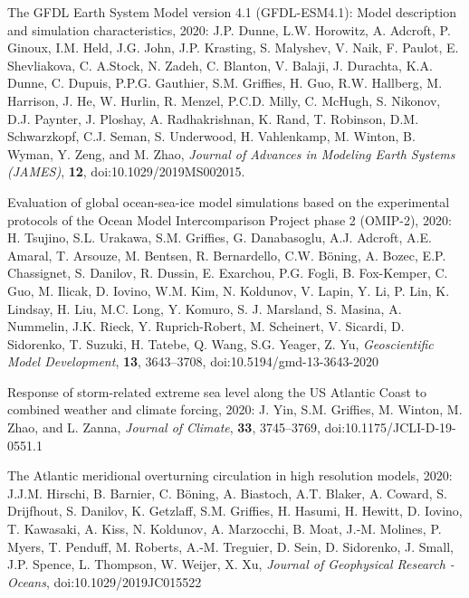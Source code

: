 \begin{etaremune}
\item The GFDL Earth System Model version 4.1 (GFDL-ESM4.1): Model description and simulation characteristics, 2020: J.P. Dunne, L.W. Horowitz, A. Adcroft, P. Ginoux, I.M. Held, J.G. John, J.P. Krasting, S. Malyshev, V. Naik, F. Paulot, E. Shevliakova, C. A.Stock, N. Zadeh, C. Blanton, V. Balaji, J. Durachta, K.A. Dunne, C. Dupuis, P.P.G. Gauthier, S.M. Griffies, H. Guo, R.W. Hallberg, M. Harrison, J. He, W. Hurlin, R. Menzel, P.C.D. Milly, C. McHugh, S. Nikonov, D.J. Paynter, J. Ploshay, A. Radhakrishnan, K. Rand, T. Robinson, D.M. Schwarzkopf, C.J. Seman, S. Underwood, H. Vahlenkamp, M. Winton, B. Wyman, Y. Zeng, and M. Zhao, {\it Journal of Advances in Modeling Earth Systems (JAMES)}, {\bf 12}, doi:10.1029/2019MS002015.

\item Evaluation of global ocean-sea-ice model simulations based on the experimental protocols of the Ocean Model Intercomparison Project phase 2 (OMIP-2), 2020: H. Tsujino, S.L. Urakawa, S.M. Griffies, G. Danabasoglu, A.J. Adcroft, A.E. Amaral, T. Arsouze, M. Bentsen, R. Bernardello, C.W. {B\"{o}ning}, A. Bozec, E.P. Chassignet, S. Danilov, R. Dussin, E. Exarchou, P.G. Fogli, B. Fox-Kemper, C. Guo, M. Ilicak, D. Iovino, W.M. Kim, N. Koldunov, V. Lapin, Y. Li, P. Lin, K. Lindsay, H. Liu, M.C. Long, Y. Komuro, S. J. Marsland, S. Masina, A. Nummelin, J.K. Rieck, Y. Ruprich-Robert, M. Scheinert, V. Sicardi, D. Sidorenko, T. Suzuki, H. Tatebe, Q. Wang, S.G. Yeager, Z. Yu, {\it  Geoscientific Model Development}, {\bf 13}, 3643--3708, doi:10.5194/gmd-13-3643-2020

\item Response of storm-related extreme sea level along the US Atlantic Coast to combined weather and climate forcing, 2020: J. Yin, S.M. Grif\/f\/ies, M. Winton, M. Zhao, and L. Zanna, {\it Journal of Climate}, {\bf 33}, 3745--3769, doi:10.1175/JCLI-D-19-0551.1

\item The Atlantic meridional overturning circulation in high resolution models, 2020: J.J.M. Hirschi, B. Barnier, C. {B\"{o}ning}, A. Biastoch, A.T. Blaker, A. Coward, S. Drijfhout, S. Danilov, K. Getzlaff, S.M. Grif\/f\/ies, H. Hasumi, H. Hewitt, D. Iovino, T. Kawasaki, A. Kiss, N. Koldunov, A. Marzocchi, B. Moat, J.-M. Molines, P. Myers, T. Penduff, M. Roberts, A.-M. Treguier, D. Sein, D. Sidorenko, J. Small, J.P. Spence, L. Thompson, W. Weijer, X. Xu, {\it Journal of Geophysical Research - Oceans}, doi:10.1029/2019JC015522


\end{etaremune}
